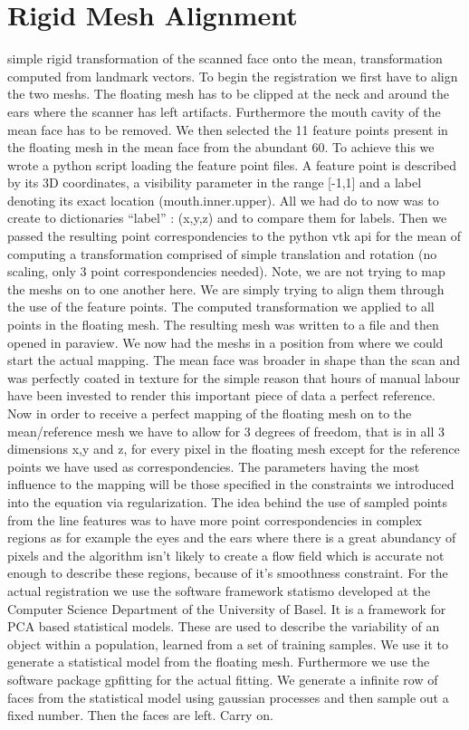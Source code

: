\section{Rigid Mesh Alignment}
simple rigid transformation of the scanned face onto the mean, transformation computed from landmark vectors.
To begin the registration we first have to align the two meshs. The floating mesh has to be clipped at the neck and around the ears where the scanner has left artifacts. Furthermore the mouth cavity of the mean face has to be removed. We then selected the 11 feature points present in the floating mesh in the mean face from the abundant 60. To achieve this we wrote a python script loading the feature point files. A feature point is described by its 3D coordinates, a visibility parameter
in the range [-1,1] and a label denoting its exact location (mouth.inner.upper). All we had do to now was to create to dictionaries “label” : (x,y,z) and to compare them for labels. Then we passed the resulting point correspondencies to the python vtk api for the mean of computing a transformation comprised of simple translation and rotation (no scaling, only 3 point correspondencies needed). Note, we are not trying to map the meshs on to one another here. We are simply trying to
    align them through the use of the feature points. The computed transformation we applied to all points in the floating mesh. The resulting mesh was written to a file and then opened in paraview. We now had the meshs in a position from where we could start the actual mapping. The mean face was broader in shape than the scan and was perfectly coated in texture for the simple reason that hours of manual labour have been invested to render this important piece of data a perfect
    reference.
    Now in order to receive a perfect mapping of the floating mesh on to the mean/reference mesh we have to allow for 3 degrees of freedom, that is in all 3 dimensions x,y and z, for every pixel in the floating mesh except for the reference points we have used as correspondencies. The parameters having the most influence to the mapping will be those specified in the constraints we introduced into the equation via regularization. The idea behind the use of sampled points from
    the line features was to have more point correspondencies in complex regions as for example the eyes and the ears where there is a great abundancy of pixels and the algorithm isn’t likely to create a flow field which is accurate not enough to describe these regions, because of it’s smoothness constraint.
    For the actual registration we use the software framework statismo developed at the Computer Science Department of the University of Basel. It is a framework for PCA based statistical models. These are used to describe the variability of an object within a population, learned from a set of training samples. We use it to generate a statistical model from the floating mesh. Furthermore we use the software package gpfitting for the actual fitting. We generate a infinite row of
    faces from the statistical model using gaussian processes and then sample out a fixed number. Then the faces are left. Carry on.

